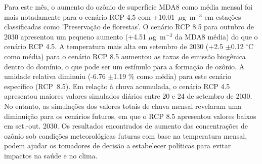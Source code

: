 \begin{spacing}{1.5}
			Para este mês, o aumento do ozônio de superfície MDA8 como média mensal foi mais notadamente para o cenário RCP 4.5 com +10.01~$\mu$g~m$^{-3}$ em estações classificadas como 'Preservação de florestas'. O cenário RCP 8.5 para outubro de 2030 apresentou um pequeno aumento (+4.51 $\mu$g~m$^{-3}$ da MDA8 média) do que o cenário RCP 4.5. A temperatura mais alta em setembro de 2030 (+2.5 $\pm$0.12 $^{\circ}$C como média) para o cenário RCP 8.5 aumentou as taxas de emissão biogênica dentro do domínio, o que pode ser um estímulo para a formação de ozônio. A umidade relativa diminuiu (-6.76 $\pm$1.19 \% como média) para este cenário específico (RCP~8.5). Em relação à chuva acumulada, o cenário RCP 4.5 apresentou maiores valores simulados diários entre 20 e 24 de setembro de 2030. No entanto, as simulações dos valores totais de chuva mensal revelaram uma diminuição para os cenários futuros, em que o RCP 8.5 apresentou valores baixos em set.-out. 2030.
			Os resultados encontrados de aumento das concentrações de ozônio sob condições meteorológicas futuras com base na temperatura mensal, podem ajudar os tomadores de decisão a estabelecer políticas para evitar impactos na saúde e no clima.
		\cleardoublepage
	
		\thispagestyle{empty} \tableofcontents \cleardoublepage

		\thispagestyle{empty} \listoftables \cleardoublepage	
		
		\thispagestyle{empty} \listoffigures \cleardoublepage	
	\mainmatter
	\pagestyle{mainmatter}
		
		
		
		

	
	
	 \clearpage

	\begin{appendix}
		
	\end{appendix}
	
\end{spacing}



